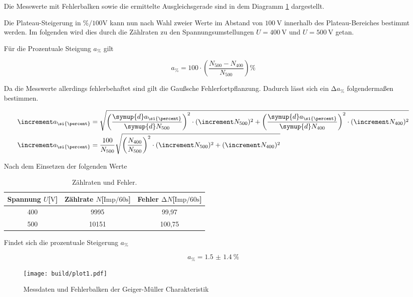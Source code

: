 \begin{flushleft}
Die Messwerte mit Fehlerbalken sowie die ermittelte Ausgleichsgerade sind in dem Diagramm
\ref{fig:plot1} dargestellt.

Die Plateau-Steigerung in $\si{\percent\per{100}\volt}$ kann nun nach Wahl zweier Werte im Abstand von $\SI{100}{\volt}$ innerhalb
des Plateau-Bereiches bestimmt werden. Im folgenden wird dies durch die Zählraten zu den Spannungsumstellungen $U = \SI{400}{\volt}$ und
$U = \SI{500}{\volt}$ getan.

Für die Prozentuale Steigung $a_{\si{\percent}}$ gilt 

\begin{equation}
a_{\si{\percent}} = 100 \cdot\left( \frac{N_{500} - N_{400} }{N_{500}} \right) \si{\percent}
\end{equation}

Da die Messwerte allerdings fehlerbehaftet sind gilt die Gaußsche Fehlerfortpflanzung. Dadurch lässt sich
ein $\increment a_{\si{\percent}}$ folgendermaßen bestimmen.

\begin{align}
\increment a_{\si{\percent}} &= \sqrt{\left(\frac{\symup{d}a_{\si{\percent}}}{\symup{d}N_{500}}\right)^{2} \cdot 
(\increment N_{500})^{2} + \left(\frac{\symup{d}a_{\si{\percent}}}{\symup{d}N_{400}}\right)^{2} \cdot
(\increment N_{400})^{2}} \\
\increment a_{\si{\percent}} &= \frac{100}{N_{500}}\sqrt{\left(\frac{N_{400}}{N_{500}}\right)^{2} \cdot 
(\increment N_{500})^{2} +
(\increment N_{400})^{2}}
\end{align}

Nach dem Einsetzen der folgenden Werte

\begin{table}
\centering
\caption{Zählraten und Fehler.}
\label{tab:ogemessdaten2}
\begin{tabular}{c c c}
    \toprule
    Spannung $U$[$\si{\volt}$] & Zählrate $N$[$\text{Imp}\si{\per{60}\second}$] & Fehler $\increment N$[$\text{Imp}\si{\per{60}\second}$]\\
    \midrule
    400   & 9995 & 99{,}97\\
    500	  & 10151 & 100{,}75\\
    \bottomrule
\end{tabular}
\end{table}

Findet sich die prozentuale Steigerung $a_{\si{\percent}}$

\begin{equation}
a_{\si{\percent}} = \SI{1.5(14)}{\percent}
\end{equation}

\end{flushleft}
\begin{figure}[h]
  \centering
  \texttt{[image: build/plot1.pdf]}
  \caption{Messdaten und Fehlerbalken der Geiger-Müller Charakteristik}
  \label{fig:plot1}
\end{figure}
